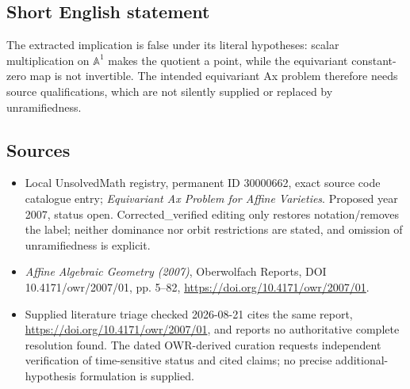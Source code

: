 \documentclass[11pt]{article}
\begin{document}
\subsection{Short English statement}
The extracted implication is false under its literal hypotheses: scalar multiplication on $\mathbb A^1$ makes the quotient a point, while the equivariant constant-zero map is not invertible. The intended equivariant Ax problem therefore needs source qualifications, which are not silently supplied or replaced by unramifiedness.
\subsection{Sources}
\begin{itemize}
\item Local UnsolvedMath registry, permanent ID 30000662, exact source code catalogue entry; \emph{Equivariant Ax Problem for Affine Varieties}. Proposed year 2007, status open. Corrected\_verified editing only restores notation/removes the label; neither dominance nor orbit restrictions are stated, and omission of unramifiedness is explicit.
\item \emph{Affine Algebraic Geometry (2007)}, Oberwolfach Reports, DOI 10.4171/owr/2007/01, pp. 5--82, \url{https://doi.org/10.4171/owr/2007/01}.
\item Supplied literature triage checked 2026-08-21 cites the same report, \url{https://doi.org/10.4171/owr/2007/01}, and reports no authoritative complete resolution found. The dated OWR-derived curation requests independent verification of time-sensitive status and cited claims; no precise additional-hypothesis formulation is supplied.
\end{itemize}
\end{document}
